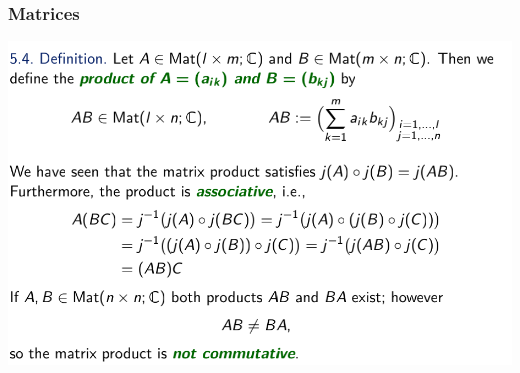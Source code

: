 \documentclass[12pt, t]{beamer}
\begin{document}
\begin{frame}
    \frametitle{Matrices}
    \begin{center}
        \includegraphics[width=\textwidth]{4}
    \end{center}
\end{frame}
\end{document}
